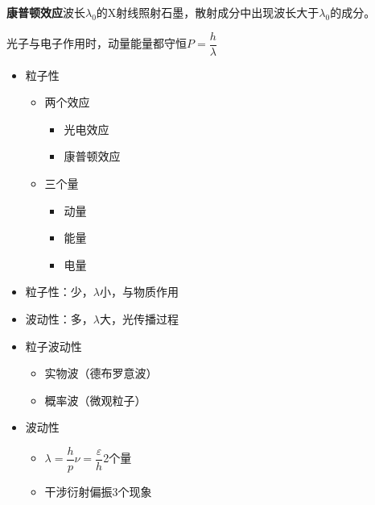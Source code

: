 \textbf{康普顿效应}\quad 波长$\lambda_0$的X射线照射石墨，散射成分中出现波长大于$\lambda_0$的成分。

光子与电子作用时，动量能量都守恒\quad $P=\dfrac{h}{\lambda}$
\begin{itemize}
\item 粒子性
  \begin{itemize}
  \item 两个效应
    \begin{itemize}
    \item 光电效应
    \item 康普顿效应
    \end{itemize}
  \item 三个量
    \begin{itemize}
    \item 动量
    \item 能量
    \item 电量
    \end{itemize}
  \end{itemize}
\end{itemize}

\begin{itemize}
\item 粒子性：少，$\lambda$小，与物质作用
\item 波动性：多，$\lambda$大，光传播过程
\end{itemize}

\begin{itemize}
\item 粒子波动性
  \begin{itemize}
  \item 实物波（德布罗意波）
  \item 概率波（微观粒子）
  \end{itemize}
\item 波动性
  \begin{itemize}
  \item $\lambda=\dfrac{h}{p}$\quad $\nu=\dfrac{\varepsilon}{h}$\qquad 2个量
  \item 干涉\quad 衍射\quad 偏振\qquad 3个现象
  \end{itemize}
\end{itemize}

